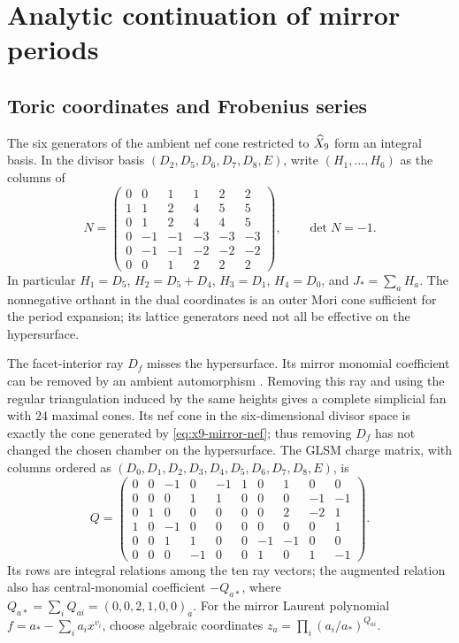 \section{Analytic continuation of mirror periods}
\label{app:mirror-periods}

\subsection{Toric coordinates and Frobenius series}

The six generators of the ambient nef cone restricted to
$\widehat X_9$ form an integral basis. In the divisor basis
$(D_2,D_5,D_6,D_7,D_8,E)$, write $(H_1,\ldots,H_6)$ as the columns
of
\begingroup\setlength{\arraycolsep}{4pt}
\begin{equation}
 N=\begin{pmatrix}
 0&0&1&1&2&2\\
 1&1&2&4&5&5\\
 0&1&2&4&4&5\\
 0&-1&-1&-3&-3&-3\\
 0&-1&-1&-2&-2&-2\\
 0&0&1&2&2&2
 \end{pmatrix},\qquad \det N=-1.
 \label{eq:x9-mirror-nef}
\end{equation}
\endgroup
In particular $H_1=D_5$, $H_2=D_5+D_4$, $H_3=D_1$,
$H_4=D_0$, and $J_*=\sum_aH_a$. The nonnegative orthant in the
dual coordinates is an outer Mori cone sufficient for the period
expansion; its lattice generators need not all be effective on
the hypersurface.

The facet-interior ray $D_f$ misses the hypersurface. Its mirror
monomial coefficient can be removed by an ambient automorphism
\cite[Section~3.1]{Demirtas:2024Mirror}. Removing this ray and
using the regular triangulation induced by the same heights gives
a complete simplicial fan with $24$ maximal cones. Its nef cone
in the six-dimensional divisor space is exactly the cone generated
by \eqref{eq:x9-mirror-nef}; thus removing $D_f$ has not changed
the chosen chamber on the hypersurface.
The GLSM charge matrix, with columns ordered as
$(D_0,D_1,D_2,D_3,D_4,D_5,D_6,D_7,D_8,E)$, is
\begingroup\setlength{\arraycolsep}{4pt}
\begin{equation}
 Q=\begin{pmatrix}
 0&0&-1&0&-1&1&0&1&0&0\\
 0&0&0&1&1&0&0&0&-1&-1\\
 0&1&0&0&0&0&0&2&-2&1\\
 1&0&-1&0&0&0&0&0&0&1\\
 0&0&1&1&0&0&-1&-1&0&0\\
 0&0&0&-1&0&0&1&0&1&-1
 \end{pmatrix}.
 \label{eq:x9-mirror-glsm}
\end{equation}
\endgroup
Its rows are integral relations among the ten ray vectors;
the augmented relation also has central-monomial coefficient
$-Q_{a*}$, where $Q_{a*}=\sum_iQ_{ai}=(0,0,2,1,0,0)_a$.
For the mirror Laurent polynomial
$f=a_* -\sum_i a_i x^{v_i}$, choose algebraic coordinates
$z_a=\prod_i(a_i/a_*)^{Q_{ai}}$.

